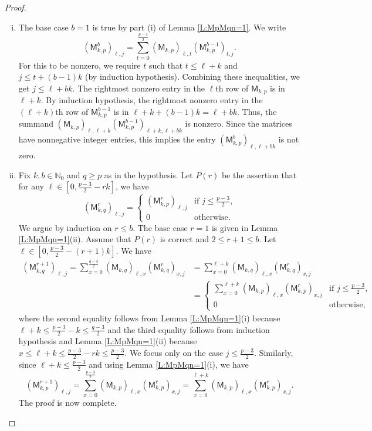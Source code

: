 \documentclass[12pt,reqno]{amsart}
\newcommand{\NN}{\mathbb{N}}
\renewcommand{\geq}{\geqslant}
\renewcommand{\leq}{\leqslant}
\newcommand{\M}{\mathsf{M}}
\theoremstyle{definition}
\numberwithin{equation}{section}
\begin{document}
\begin{proof}
	\begin{enumerate}[(i)]
		\item The base case $b=1$ is true by part (i) of Lemma \ref{L:MpMqn=1}. We write
		\[(\M_{k,p}^b)_{\ell,j} = \sum_{t=0}^{\frac{p-3}{2}} (\M_{k,p})_{\ell,t} (\M_{k,p}^{b-1})_{t,j}.\]
		For this to be nonzero, we require $t$ such that $t \leq \ell + k$ and $j \leq t + (b-1)k$ (by induction hypothesis). Combining these inequalities, we get $j \leq \ell + bk$.	The rightmost nonzero entry in the $\ell$th row of $\M_{k,p}$ is in $\ell+k$. By induction hypothesis, the rightmost nonzero entry in the $(\ell+k)$th row of $\M_{k,p}^{b-1}$ is in $\ell+k+(b-1)k = \ell+bk$. Thus, the summand $(\M_{k,p})_{\ell,\ell+k} (\M_{k,p}^{b-1})_{\ell+k,\ell+bk}$ is nonzero. Since the matrices have nonnegative integer entries, this implies the entry $(\M_{k,p}^b)_{\ell,\ell+bk}$ is not zero.
		\item Fix $k,b\in\NN_0$ and $q\geq p$ as in the hypothesis. Let $P(r)$ be the assertion that for any $\ell\in [0,\frac{p-3}{2}-rk]$, we have \[(\M_{k,q}^r)_{\ell,j}=\left \{\begin{array}{ll} (\M_{k,p}^r)_{\ell,j}& \text{if $j\leq \frac{p-3}{2}$,}\\ 0&\text{otherwise.}\end{array}\right .\] We argue by induction on $r\leq b$. The base case $r=1$ is given in Lemma \ref{L:MpMqn=1}(ii). Assume that $P(r)$ is correct and $2 \leq r+1\leq b$. Let $\ell\in [0,\frac{p-3}{2}-(r+1)k]$. We have 
  \begin{align*}\label{Eq:IndMq}
  (\M_{k,q}^{r+1})_{\ell,j}=\sum_{x=0}^{\frac{q-3}{2}} (\M_{k,q})_{\ell,x}(\M_{k,q}^r)_{x,j}&= \sum_{x=0}^{\ell+k} (\M_{k,q})_{\ell,x}(\M_{k,q}^r)_{x,j}\\
  &=\left \{\begin{array}{ll} \sum_{x=0}^{\ell+k} (\M_{k,p})_{\ell,x}(\M_{k,p}^r)_{x,j}&\text{if $j\leq\frac{p-3}{2}$,}\\ 0&\text{otherwise,}\end{array}\right .
  \end{align*} where the second equality follows from Lemma \ref{L:MpMqn=1}(i) because $\ell+k\leq \frac{p-3}{2}-k\leq \frac{q-3}{2}$ and the third equality follows from induction hypothesis and Lemma \ref{L:MpMqn=1}(ii) because $x\leq \ell+k\leq \frac{p-3}{2}-rk\leq \frac{p-3}{2}$. We focus only on the case $j\leq \frac{p-3}{2}$. Similarly, since $\ell+k\leq\frac{p-3}{2}$ and using Lemma \ref{L:MpMqn=1}(i), we have \[(\M_{k,p}^{r+1})_{\ell,j}=\sum_{x=0}^{\frac{p-3}{2}} (\M_{k,p})_{\ell,x}(\M_{k,p}^r)_{x,j}= \sum_{x=0}^{\ell+k} (\M_{k,p})_{\ell,x}(\M_{k,p}^r)_{x,j}.\] The proof is now complete. 
  \end{enumerate}
\end{proof}
\end{document}
